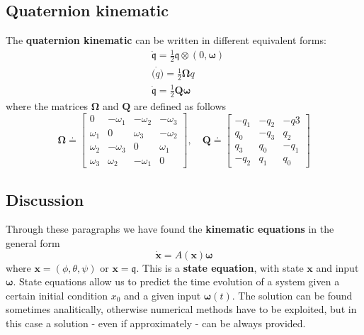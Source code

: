 \subsection{Quaternion kinematic}
The \textbf{quaternion kinematic} can be written in different equivalent forms:
\begin{align}
    &\dot{\mathfrak{q}}=\frac{1}{2}\mathfrak{q}\otimes(0,\boldsymbol{\omega})\\
    &\dot{\mathfrak(q)}=\frac{1}{2}\boldsymbol{\Omega}q\\
    &\dot{\mathfrak{q}}=\frac{1}{2}\mathbf{Q}\boldsymbol{\omega}
\end{align}
where the matrices $\boldsymbol{\Omega}$ and $\mathbf{Q}$ are defined as follows
\begin{equation*}
    \boldsymbol{\Omega}\doteq\begin{bmatrix}
        0&-\omega_1&-\omega_2&-\omega_3\\
        \omega_1&0&\omega_3&-\omega_2\\
        \omega_2&-\omega_3&0&\omega_1\\
        \omega_3&\omega_2&-\omega_1&0
    \end{bmatrix}, \quad 
    \mathbf{Q}\doteq \begin{bmatrix}
        -q_1&-q_2&-q3\\
        q_0&-q_3&q_2\\
        q_3&q_0&-q_1\\
        -q_2&q_1&q_0
    \end{bmatrix}
\end{equation*} 

\subsection{Discussion}
Through these paragraphs we have found the \textbf{kinematic equations} in the general form
{\large{
    \begin{equation}
        \dot{\mathbf{x}} = A(\mathbf{x})\boldsymbol{\omega}
    \end{equation}
}}
where $\mathbf{x}=(\phi, \theta, \psi)$ or $\mathbf{x}=\mathfrak{q}$. This is a \textbf{state equation}, with state $\mathbf{x}$ and input $\boldsymbol{\omega}$. State equations allow us to predict the time evolution of a system given a certain initial condition $x_0$ and a given input $\boldsymbol{\omega}(t)$. The solution can be found sometimes analitically, otherwise numerical methods have to be exploited, but in this case a solution - even if approximately - can be always provided.

